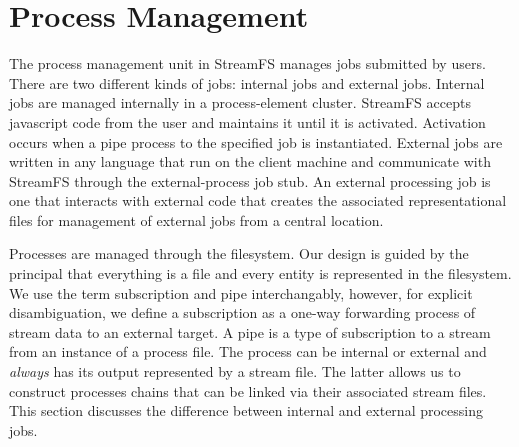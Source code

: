 \section{Process Management}
\label{sec:promngt}

The process management unit in StreamFS manages jobs submitted by users.  There are two different kinds of jobs: internal
jobs and external jobs.  Internal jobs are managed internally in a process-element cluster.  StreamFS accepts javascript code
from the user and maintains it until it is activated.  Activation occurs when a pipe process to the specified job
is instantiated.  External jobs are written in any language that run on the client machine and communicate with StreamFS
through the external-process job stub.  An external processing job
is one that interacts with external code that creates the associated representational files for management 
of external jobs from a central location.

Processes are managed through the filesystem.  Our design is guided by the principal that everything is a file and
every entity is represented in the filesystem.  We use the term subscription and pipe interchangably, however, for 
explicit disambiguation, we define a subscription as a one-way forwarding process of stream data to an external
target.  A pipe is a type of subscription to a stream from an instance of a process file.  The process can
be internal or external and \emph{always} has its output represented by a stream file.  The latter allows us
to construct processes chains that can be linked via their associated stream files.
This section discusses the difference between internal and external processing jobs.  


